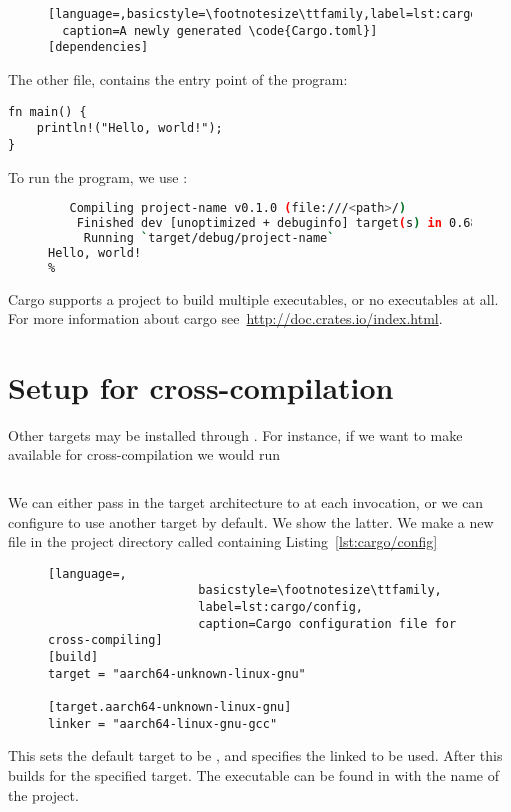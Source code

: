 \documentclass[b5paper,twoside]{report}
\begin{document}
\begin{appendices}
\begin{figure}[ht]
\begin{lstlisting}[language=,basicstyle=\footnotesize\ttfamily,label=lst:cargo.toml,
  caption=A newly generated \code{Cargo.toml}]
[dependencies]
  \end{lstlisting}
\end{figure}
  The other file,  contains the entry point of the program:
  \begin{lstlisting}
fn main() {
    println!("Hello, world!");
}
  \end{lstlisting}

  To run the program, we use \cargo{}:
  \begin{figure}[ht]
  \begin{lstlisting}[language=Bash,numbers=none]
% cargo run
   Compiling project-name v0.1.0 (file:///<path>/)
    Finished dev [unoptimized + debuginfo] target(s) in 0.68 secs
     Running `target/debug/project-name`
Hello, world!
%
  \end{lstlisting}
\end{figure}

  Cargo supports a project to build multiple executables, or no executables at all.
  For more information about cargo see~\url{http://doc.crates.io/index.html}.


  \section*{Setup for cross-compilation}
  Other targets may be installed through \rustup{}. For instance, if we want to
  make  available for cross-compilation we would run
  \begin{lstlisting}[language=Bash,numbers=none]
% rustup target add aarch64-unknown-linux-gnu
  \end{lstlisting}
  We can either pass in the target architecture to \cargo{} at each invocation,
  or we can configure \cargo{} to use another target by default. We show the latter.
  We make a new file in the project directory called 
  containing Listing~\ref{lst:cargo/config}
  \begin{figure}[ht]
  \begin{lstlisting}[language=,
                     basicstyle=\footnotesize\ttfamily,
                     label=lst:cargo/config,
                     caption=Cargo configuration file for cross-compiling]
[build]
target = "aarch64-unknown-linux-gnu"

[target.aarch64-unknown-linux-gnu]
linker = "aarch64-linux-gnu-gcc"
  \end{lstlisting}
  \end{figure}
  This sets the default target to be ,
  and specifies the linked to be used.
  After this  builds for the specified target.
  The executable can be found in 
  with the name of the project.




\end{appendices}



\end{document}
